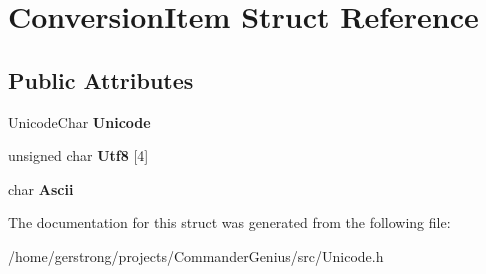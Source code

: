 \hypertarget{struct_conversion_item}{
\section{ConversionItem Struct Reference}
\label{struct_conversion_item}
}
\subsection*{Public Attributes}
\begin{DoxyCompactItemize}
\item 
\hypertarget{struct_conversion_item_acb1ca58017b46411f31b7caf297538d4}{
UnicodeChar {\bfseries Unicode}}
\label{struct_conversion_item_acb1ca58017b46411f31b7caf297538d4}

\item 
\hypertarget{struct_conversion_item_a049a171257d5859e6406420c74b73a98}{
unsigned char {\bfseries Utf8} \mbox{[}4\mbox{]}}
\label{struct_conversion_item_a049a171257d5859e6406420c74b73a98}

\item 
\hypertarget{struct_conversion_item_a1892db05c8c58403cbc28a300c6563b9}{
char {\bfseries Ascii}}
\label{struct_conversion_item_a1892db05c8c58403cbc28a300c6563b9}

\end{DoxyCompactItemize}


The documentation for this struct was generated from the following file:\begin{DoxyCompactItemize}
\item 
/home/gerstrong/projects/CommanderGenius/src/Unicode.h\end{DoxyCompactItemize}
